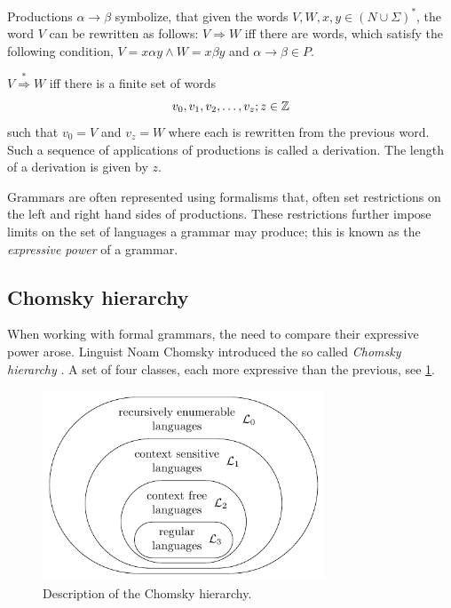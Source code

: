 Productions $\alpha \rightarrow \beta$ symbolize, that given the words $V,W,x,y \in \left( N \cup \Sigma \right)^{*}$, the word $V$ can be rewritten as follows:
$V \Rightarrow W$ iff there are words, which satisfy the following condition, $V=x\alpha y \wedge W=x\beta y$ and $\alpha \rightarrow \beta \in P$.

\begin{definition}[Derivation]
\label{def:derivation}
$V \stackrel{*}{\Rightarrow}  W$ iff there is a finite set of words 
$$ v_0, v_1, v_2, \dots, v_z;\medskip z \in \mathbb{Z}$$
such that $v_0 = V$ and $v_z = W$ where each is rewritten from the previous word. Such a sequence of applications of productions is called a derivation.
The length of a derivation is given by $z$. 
\end{definition}

Grammars are often represented using formalisms that, often set restrictions on the left and right hand sides of productions. These restrictions further impose limits on the set of languages a grammar may produce; this is known as the \emph{expressive power} of a grammar. 

\subsection{Chomsky hierarchy}
When working with formal grammars, the need to compare their expressive power arose. Linguist Noam Chomsky introduced the so called \emph{Chomsky hierarchy} \cite{chomsky1956three}. A set of four classes, each more expressive than the previous, see \cref{fig:chomsky-hierarchy}.



\begin{figure}[H]
  \label{fig:chomsky-hierarchy}
  \centering
  \includegraphics[width=0.75\textwidth]{figures/chomsky-hierarchy.pdf}
  \caption{Description of the Chomsky hierarchy.}
\end{figure}

